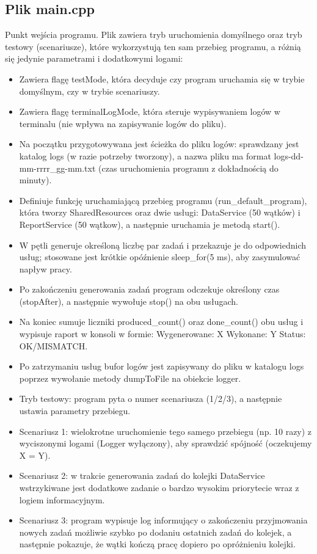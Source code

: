 \documentclass[a4paper,12pt]{article}
\begin{document}
        \subsection{Plik main.cpp}
            \vspace{-0.2em}
            Punkt wejścia programu. Plik zawiera tryb uruchomienia domyślnego oraz tryb testowy (scenariusze), które wykorzystują ten sam przebieg programu, a różnią się jedynie parametrami i dodatkowymi logami:
            \begin{itemize}
                \item Zawiera flagę testMode, która decyduje czy program uruchamia się w trybie domyślnym, czy w trybie scenariuszy.
                \item Zawiera flagę terminalLogMode, która steruje wypisywaniem logów w terminalu (nie wpływa na zapisywanie logów do pliku).
                \item Na początku przygotowywana jest ścieżka do pliku logów: sprawdzany jest katalog logs (w razie potrzeby tworzony), a nazwa pliku ma format logs-dd-mm-rrrr\_gg-mm.txt (czas uruchomienia programu z dokładnością do minuty).
                \item Definiuje funkcję uruchamiającą przebieg programu (run\_default\_program), która tworzy SharedResources oraz dwie usługi: DataService (50 wątków) i ReportService (50 wątkow), a następnie uruchamia je metodą start().
                \item W pętli generuje określoną liczbę par zadań i przekazuje je do odpowiednich usług; stosowane jest krótkie opóźnienie sleep\_for(5 ms), aby zasymulować napływ pracy.
                \item Po zakończeniu generowania zadań program odczekuje określony czas (stopAfter), a następnie wywołuje stop() na obu usługach.
                \item Na koniec sumuje liczniki produced\_count() oraz done\_count() obu usług i wypisuje raport w konsoli w formie: Wygenerowane: X Wykonane: Y Status: OK/MISMATCH.
                \item Po zatrzymaniu usług bufor logów jest zapisywany do pliku w katalogu logs poprzez wywołanie metody dumpToFile na obiekcie logger.
                \item Tryb testowy: program pyta o numer scenariusza (1/2/3), a następnie ustawia parametry przebiegu.
                \item Scenariusz 1: wielokrotne uruchomienie tego samego przebiegu (np. 10 razy) z wyciszonymi logami (Logger wyłączony), aby sprawdzić spójność (oczekujemy X = Y).
                \item Scenariusz 2: w trakcie generowania zadań do kolejki DataService wstrzykiwane jest dodatkowe zadanie o bardzo wysokim priorytecie wraz z logiem informacyjnym.
                \item Scenariusz 3: program wypisuje log informujący o zakończeniu przyjmowania nowych zadań możliwie szybko po dodaniu ostatnich zadań do kolejek, a następnie pokazuje, że wątki kończą pracę dopiero po opróżnieniu kolejki.
            \end{itemize}
        \newpage
        \vspace*{2em}
\end{document}
